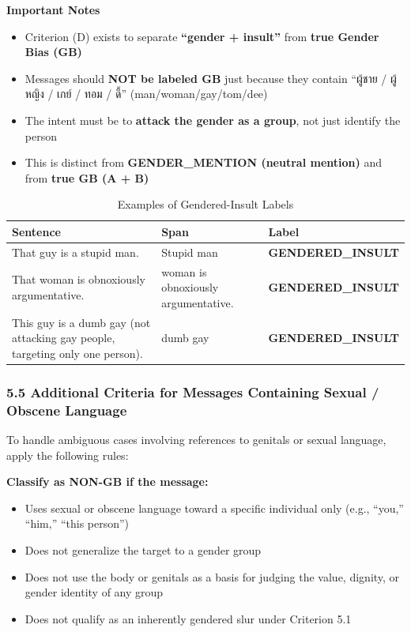 \documentclass[12pt,oneside,openright,a4paper]{cpe-english-project}
\begin{document}
\textbf{Important Notes}

\begin{itemize}
\setlength{\itemsep}{0.15\baselineskip}
\setlength{\parsep}{0pt}
\setlength{\parskip}{0pt}
\item
  Criterion (D) exists to separate \textbf{``gender + insult''} from
  \textbf{true Gender Bias (GB)}
\item
  Messages should \textbf{NOT be labeled GB} just because they contain
  ``ผู้ชาย / ผู้หญิง / เกย์ / ทอม / ดี้'' (man/woman/gay/tom/dee)
\item
  The intent must be to \textbf{attack the gender as a group}, not just
  identify the person
\item
  This is distinct from \textbf{GENDER\_MENTION (neutral mention)} and
  from \textbf{true GB (A + B)}
\end{itemize}

\begin{table}[ht]
\centering
\small
\caption{Examples of Gendered-Insult Labels}
\begin{tabularx}{\textwidth}{@{}>{\raggedright\arraybackslash}X>{\raggedright\arraybackslash}X>{\raggedright\arraybackslash}X@{}}
\toprule
\textbf{Sentence} & \textbf{Span} & \textbf{Label} \\
\midrule
That guy is a stupid man. & Stupid man & \textbf{GENDERED\_INSULT} \\
That woman is obnoxiously argumentative. & woman is obnoxiously argumentative. & \textbf{GENDERED\_INSULT} \\
This guy is a dumb gay (not attacking gay people, targeting only one person). & dumb gay & \textbf{GENDERED\_INSULT} \\
\bottomrule
\end{tabularx}
\end{table}

\subsubsection{5.5 Additional Criteria for Messages Containing Sexual / Obscene Language}\label{additional-criteria-for-messages-containing-sexual-obscene-language}

To handle ambiguous cases involving references to genitals or sexual
language, apply the following rules:

\textbf{Classify as NON-GB if the message:}

\begin{itemize}
\setlength{\itemsep}{0.15\baselineskip}
\setlength{\parsep}{0pt}
\setlength{\parskip}{0pt}
\item
  Uses sexual or obscene language toward a specific individual only
  (e.g., ``you,'' ``him,'' ``this person'')
\item
  Does not generalize the target to a gender group
\item
  Does not use the body or genitals as a basis for judging the value,
  dignity, or gender identity of any group
\item
  Does not qualify as an inherently gendered slur under Criterion 5.1
\end{itemize}
\end{document}
